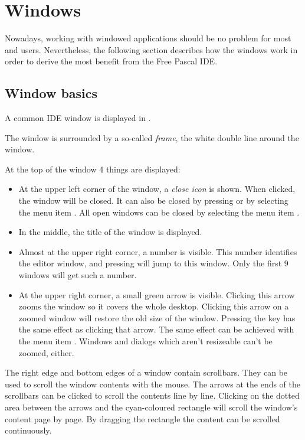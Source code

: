 \section{Windows}
\label{se:windows}
Nowadays, working with windowed applications should be no problem for
most \windows and \linux users. Nevertheless, the following section
describes how the windows work in order to derive the most benefit from the
Free Pascal IDE.
%
%
\subsection{Window basics}
\label{se:windowbasics}

A common IDE window is displayed in .


The window is surrounded by a so-called \emph{frame}, the white double
line around the window.

At the top of the window 4 things are displayed:
\begin{itemize}
\item
At the upper left corner of the window, a \emph{close icon} is shown.
When clicked, the window will be closed. It can also be closed by
 pressing  or by selecting the menu item .
All open windows can be closed by selecting the menu item
.
\item In the middle, the title of the window is displayed.
\item Almost at the upper right corner, a number is visible.
This number identifies the editor window, and pressing 
will jump to this window. Only the first 9 windows will get such a number.
\item At the upper right corner, a small green arrow is visible.
Clicking this arrow zooms the window so it covers the whole desktop.
Clicking this arrow on a zoomed window will restore the old size of the
window. Pressing the  key has the same effect as clicking
that arrow. The same effect can be achieved with the menu item
.
Windows and dialogs which aren't resizeable can't be zoomed, either.
\end{itemize}

The right edge and bottom edges of a window contain scrollbars.
They can be used to scroll the window contents with the mouse.
The arrows at the ends of the scrollbars can be clicked to scroll the
contents line by line. Clicking on the dotted area between the arrows
and the cyan-coloured rectangle will scroll the window's content
page by page. By dragging the rectangle the content can be scrolled
continuously.

